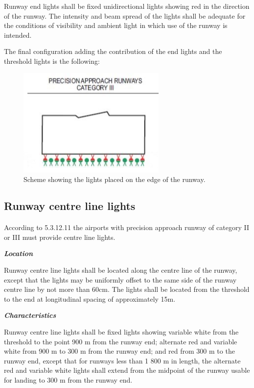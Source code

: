 		Runway end lights shall be fixed unidirectional lights showing red in the direction of the runway. The intensity and beam spread of the lights shall be adequate for the conditions of visibility and ambient light in which use of the runway is intended.
		
		The final configuration adding the contribution of the end lights and the threshold lights is the following:
		
		\begin{figure}[H]
			\centering
			\includegraphics[clip, trim=0cm 0cm 0cm 0cm, width=0.65\textwidth]{./images/Annex14/endlights}
			\caption{Scheme showing the lights placed on the edge of the runway.} %
			\label{} %
		\end{figure}
		
		\subsection{Runway centre line lights}
		\paragraph{}According to 5.3.12.11 the airports with precision approach runway of category II or III must provide centre line lights.
		
		 \textbf{\textit{Location}}
		 
		 Runway centre line lights shall be located along the centre line of the runway, except that the lights may be
		 uniformly offset to the same side of the runway centre line by not more than 60cm. The lights shall be located from the threshold to the end at longitudinal spacing of approximately 15m.
		
		\textbf{\textit{Characteristics}}
		
		Runway centre line lights shall be fixed lights showing variable white from the threshold to the point 900 m
		from the runway end; alternate red and variable white from 900 m to 300 m from the runway end; and red from 300 m to the
		runway end, except that for runways less than 1 800 m in length, the alternate red and variable white lights shall extend from
		the midpoint of the runway usable for landing to 300 m from the runway end.
		

